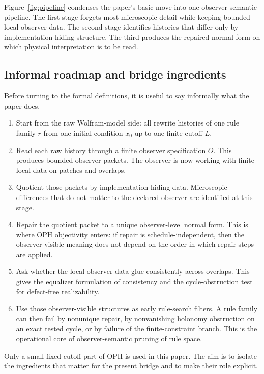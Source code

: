 \documentclass[11pt]{article}
\theoremstyle{remark}
\theoremstyle{plain}
\begin{document}
Figure~\ref{fig:pipeline} condenses the paper's basic move into one observer-semantic pipeline. The first stage forgets most microscopic detail while keeping bounded local observer data. The second stage identifies histories that differ only by implementation-hiding structure. The third produces the repaired normal form on which physical interpretation is to be read.

\subsection{Informal roadmap and bridge ingredients}

Before turning to the formal definitions, it is useful to say informally what the paper does.

\begin{enumerate}[leftmargin=2em]
\item Start from the raw Wolfram-model side: all rewrite histories of one rule family \(r\) from one initial condition \(x_0\) up to one finite cutoff \(L\).
\item Read each raw history through a finite observer specification \(O\). This produces bounded observer packets. The observer is now working with finite local data on patches and overlaps.
\item Quotient those packets by implementation-hiding data. Microscopic differences that do not matter to the declared observer are identified at this stage.
\item Repair the quotient packet to a unique observer-level normal form. This is where OPH objectivity enters: if repair is schedule-independent, then the observer-visible meaning does not depend on the order in which repair steps are applied.
\item Ask whether the local observer data glue consistently across overlaps. This gives the equalizer formulation of consistency and the cycle-obstruction test for defect-free realizability.
\item Use those observer-visible structures as early rule-search filters. A rule family can then fail by nonunique repair, by nonvanishing holonomy obstruction on an exact tested cycle, or by failure of the finite-constraint branch. This is the operational core of observer-semantic pruning of rule space.
\end{enumerate}

Only a small fixed-cutoff part of OPH is used in this paper. The aim is to isolate the ingredients that matter for the present bridge and to make their role explicit.
\end{document}
